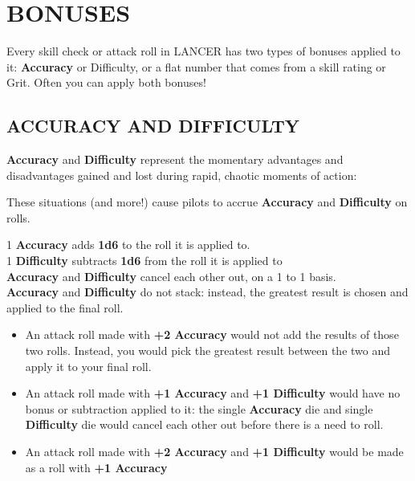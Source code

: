 \providecommand{\Accuracy}{\textbf{Accuracy }}
\providecommand{\Difficulty}{\textbf{Difficulty }}
\section{BONUSES}
Every skill check or attack roll in LANCER has two types of bonuses applied to it: \Accuracy or
Difficulty, or a flat number that comes from a skill rating or Grit. Often you can apply both bonuses!

\subsection{ACCURACY AND DIFFICULTY}
\Accuracy and \Difficulty represent the momentary advantages and disadvantages gained and
lost during rapid, chaotic moments of action:


These situations (and more!) cause pilots to accrue \Accuracy and \Difficulty on rolls.

1 \Accuracy adds \textbf{1d6} to the roll it is applied to. \\
1 \Difficulty subtracts \textbf{1d6} from the roll it is applied to \\
\Accuracy and \Difficulty cancel each other out, on a 1 to 1 basis. \\
\Accuracy and \Difficulty do not stack: instead, the greatest result is chosen and applied to the
final roll. \\
\begin{itemize}
\item An attack roll made with \textbf{+2 Accuracy} would not add the results of those two rolls. Instead, you would pick the greatest result between the two and apply it to your final roll.
\item An attack roll made with \textbf{+1 Accuracy} and \textbf{+1 Difficulty} would have no bonus or subtraction applied to it: the single \Accuracy die and single \Difficulty die would cancel each other out before there is a need to roll.
\item An attack roll made with \textbf{+2 Accuracy} and \textbf{+1 Difficulty} would be made as a roll with \textbf{+1 Accuracy}
\end{itemize}

